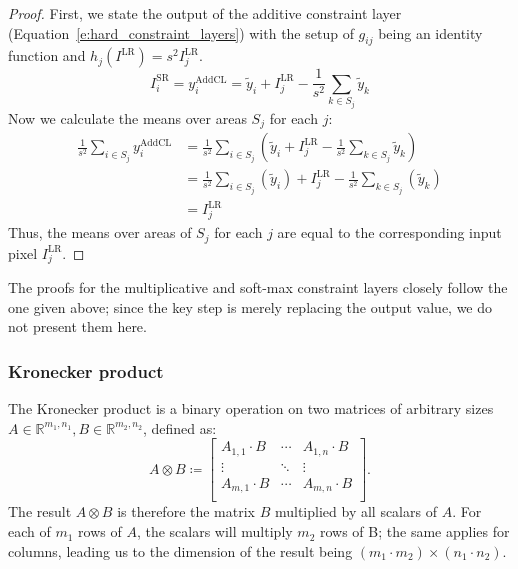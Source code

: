 \begin{proof}
First, we state the output of the additive constraint layer (Equation~\eqref{e:hard_constraint_layers}) with the setup of $g_{ij}$ being an identity function and $h_j(I^\text{LR}) = s^2 I^\text{LR}_j$.
$$
I_i^\text{SR} = y_i^\text{AddCL} = \tilde{y}_i + I^\text{LR}_j - \frac{1}{s^2} \sum_{k\in S_j}\tilde{y}_k
$$
Now we calculate the means over areas $S_j$ for each $j$:
$$
\begin{aligned}
    \frac{1}{s^2} \sum_{i \in S_j} y_i^\text{AddCL} &=
    \frac{1}{s^2} \sum_{i \in S_j} \left(\tilde{y}_i + I^\text{LR}_j - \frac{1}{s^2} \sum_{k\in S_j}\tilde{y}_k \right) \\
    &= \frac{1}{s^2} \sum_{i \in S_j} \left(\tilde{y}_i \right) + I^\text{LR}_j - \frac{1}{s^2} \sum_{k\in S_j} \left(\tilde{y}_k \right) \\
    &= I_j^\text{LR}
\end{aligned}
$$
Thus, the means over areas of $S_j$ for each $j$ are equal to the corresponding input pixel $I_j^\text{LR}$.
\end{proof}

The proofs for the multiplicative and soft-max constraint layers closely follow the one given above; since the key step is merely replacing the output value, we do not present them here.

\subsubsection{Kronecker product}
\label{sss:kronecker}

The Kronecker product is a binary operation on two matrices of arbitrary sizes $A \in \mathbb{R}^{m_1, n_1}, B \in \mathbb{R}^{m_2, n_2}$, defined as:
\begin{equation}
    A \otimes B \coloneqq 
    \begin{bmatrix}
        A_{1,1} \cdot B & \cdots & A_{1, n} \cdot B \\
        \vdots & \ddots & \vdots \\ 
        A_{m, 1} \cdot B & \cdots & A_{m, n} \cdot B \\
    \end{bmatrix}.
\end{equation}
The result $A \otimes B$ is therefore the matrix $B$ multiplied by all scalars of $A$. 
For each of $m_1$ rows of $A$, the scalars will multiply $m_2$ rows of B; the same applies for columns, leading us to the dimension of the result being $(m_1 \cdot m_2) \times (n_1 \cdot n_2)$.


